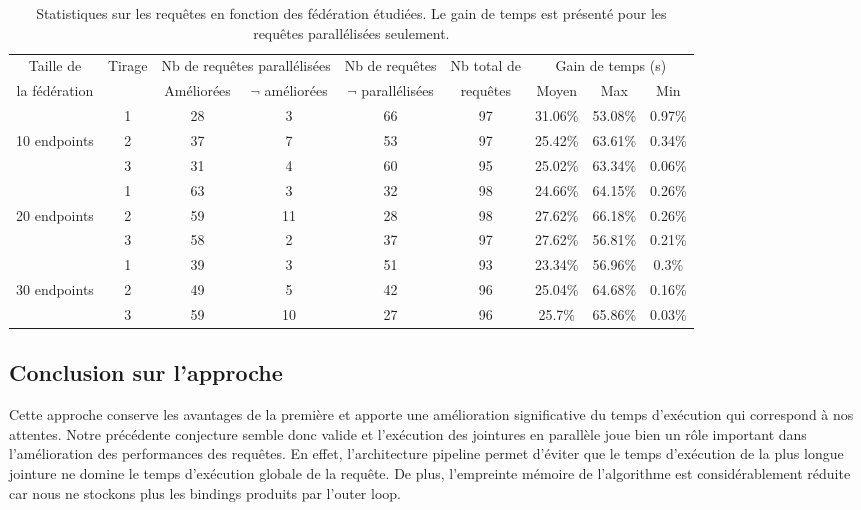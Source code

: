 \documentclass[a4paper]{article}
\begin{document}
\begin{table}[t]
    \begin{tabular}{|c|c|c|c|c|c|c|c|c|}
        \hline
        Taille de & Tirage & \multicolumn{2}{c|}{Nb de requêtes parallélisées} & Nb de requêtes & Nb total de & \multicolumn{3}{c|}{Gain de temps (s)} \\
        \cline{3-4}\cline{7-9}
         la fédération & & Améliorées & $\neg$ améliorées & $\neg$ parallélisées & requêtes & Moyen & Max & Min \\
        \hline
         & 1 & 28 & 3 & 66 & 97 & 31.06\% & 53.08\% & 0.97\% \\
        \cline{2-9}
        10 endpoints & 2 & 37 & 7 & 53 & 97 & 25.42\% & 63.61\% & 0.34\% \\
        \cline{2-9}
         & 3 & 31 & 4 & 60 & 95 & 25.02\% & 63.34\% & 0.06\% \\
        \hline
         & 1 & 63 & 3 & 32 & 98 & 24.66\% & 64.15\% & 0.26\% \\
        \cline{2-9}
        20 endpoints & 2 & 59 & 11 & 28 & 98 & 27.62\% & 66.18\% & 0.26\% \\
        \cline{2-9}
         & 3 & 58 & 2 & 37 & 97 & 27.62\% & 56.81\% & 0.21\% \\
        \hline
         & 1 & 39 & 3 & 51 & 93 & 23.34\% & 56.96\% & 0.3\% \\
        \cline{2-9}
        30 endpoints & 2 & 49 & 5 & 42 & 96 & 25.04\% & 64.68\% & 0.16\% \\
        \cline{2-9}
         & 3 & 59 & 10 & 27 & 96 & 25.7\% & 65.86\% & 0.03\% \\
        \hline
    \end{tabular}
    \caption{Statistiques sur les requêtes en fonction des fédération étudiées. Le gain de temps est présenté pour les requêtes parallélisées seulement.}
    \label{table:stats_pipeline}
\end{table}

\subsection{Conclusion sur l'approche}

Cette approche conserve les avantages de la première et apporte une amélioration significative du temps d'exécution qui correspond à nos attentes. Notre précédente conjecture semble donc valide et l'exécution des jointures en parallèle joue bien un rôle important dans l'amélioration des performances des requêtes. En effet, l'architecture pipeline permet d'éviter que le temps d'exécution de la plus longue jointure ne domine le temps d'exécution globale de la requête. De plus, l'empreinte mémoire de l'algorithme est considérablement réduite car nous ne stockons plus les bindings produits par l'outer loop.
\end{document}
